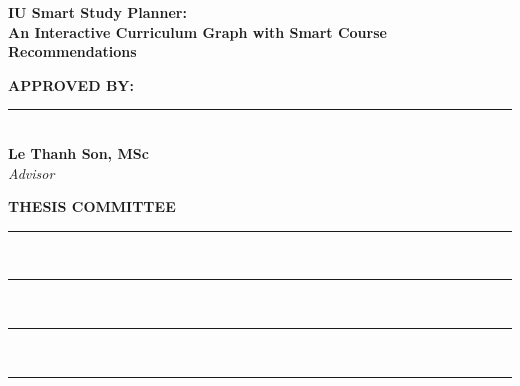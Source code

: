 \thispagestyle{empty}

\begin{center}
    {\Large\bfseries IU Smart Study Planner:\\[6pt]
    An Interactive Curriculum Graph with Smart Course Recommendations}\par
    
    \vspace{0.5in} %

    {\bfseries APPROVED BY:}
    
    \vspace{0.8in} %
    \rule{5in}{0.6pt}\\[4pt] %
    {\bfseries Le Thanh Son, MSc}\\[2pt]
    \textit{Advisor}

    \vspace{0.5in} %

    {\bfseries THESIS COMMITTEE}
    
    \vspace{0.6in}
    \rule{5in}{0.6pt}\\[25pt] %
    
    \rule{5in}{0.6pt}\\[25pt]
    
    \rule{5in}{0.6pt}\\[25pt]
    
    \rule{5in}{0.6pt}

\end{center}

\newpage
